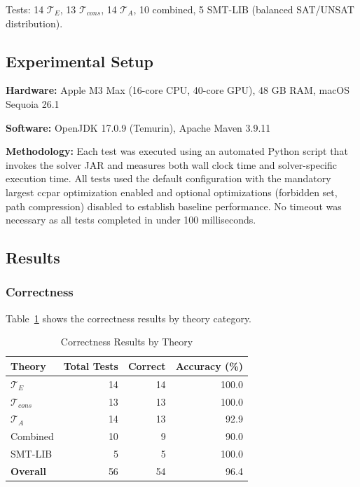 \documentclass[11pt,a4paper]{article}
\begin{document}
Tests: 14 $\mathcal{T}_E$, 13 $\mathcal{T}_{cons}$, 14 $\mathcal{T}_A$, 10 combined, 5 SMT-LIB (balanced SAT/UNSAT distribution).

\subsection{Experimental Setup}

\textbf{Hardware:} Apple M3 Max (16-core CPU, 40-core GPU), 48 GB RAM, macOS Sequoia 26.1

\textbf{Software:} OpenJDK 17.0.9 (Temurin), Apache Maven 3.9.11

\textbf{Methodology:} Each test was executed using an automated Python script that invokes the solver JAR and measures both wall clock time and solver-specific execution time. All tests used the default configuration with the mandatory largest ccpar optimization enabled and optional optimizations (forbidden set, path compression) disabled to establish baseline performance. No timeout was necessary as all tests completed in under 100 milliseconds.

\subsection{Results}

\subsubsection{Correctness}

Table~\ref{tab:correctness} shows the correctness results by theory category.

\begin{table}[h]
\centering
\caption{Correctness Results by Theory}
\label{tab:correctness}
\begin{tabular}{@{}lrrr@{}}
\toprule
\textbf{Theory} & \textbf{Total Tests} & \textbf{Correct} & \textbf{Accuracy (\%)} \\
\midrule
$\mathcal{T}_E$ & 14 & 14 & 100.0 \\
$\mathcal{T}_{cons}$ & 13 & 13 & 100.0 \\
$\mathcal{T}_A$ & 14 & 13 & 92.9 \\
Combined & 10 & 9 & 90.0 \\
SMT-LIB & 5 & 5 & 100.0 \\
\midrule
\textbf{Overall} & 56 & 54 & 96.4 \\
\bottomrule
\end{tabular}
\end{table}
\end{document}
